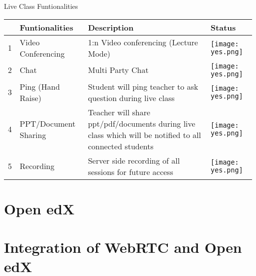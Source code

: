Live Class Funtionalities
\begin{center}
 \begin{tabular}{|p{0.4cm}|p{4cm}|p{9cm}|p{1.3cm}|} 
 \hline
  & \textbf{Funtionalities} & \textbf{Description} & \textbf{Status} \\ [0.5ex] 
 \hline
 1 & Video Conferencing & 1:n Video conferencing (Lecture Mode) & \texttt{[image: yes.png]} \\ 
 \hline
 2 & Chat & Multi Party Chat & \texttt{[image: yes.png]} \\
 \hline
 3 & Ping (Hand Raise) & Student will ping teacher to ask question during live class & \texttt{[image: yes.png]} \\
 \hline
 4 & PPT/Document Sharing & Teacher will share ppt/pdf/documents during live class which will be notified to all connected students & \texttt{[image: yes.png]} \\
 \hline
 5 & Recording & Server side recording of all sessions for future access & \texttt{[image: yes.png]} \\
 \hline
 \end{tabular}
\end{center}













\section{Open edX}

\section{Integration of WebRTC and Open edX}